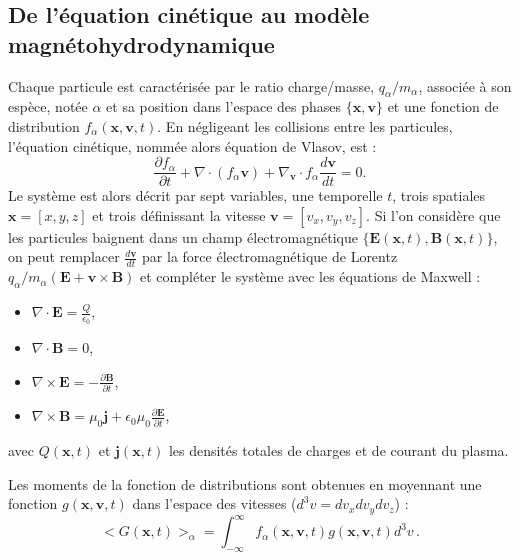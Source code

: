 \subsection{De l'équation cinétique au modèle magnétohydrodynamique}
\label{ssec-1111}

Chaque particule est caractérisée par le ratio charge/masse, $q_{\alpha}/m_{\alpha}$, associée à son espèce, notée $\alpha$ et sa position dans l'espace des phases $\{\mathbf{x},\mathbf{v}\}$ et une fonction de distribution $f_{\alpha}(\mathbf{x},\mathbf{v},t)$. En négligeant les collisions entre les particules, l'équation cinétique, nommée alors équation de Vlasov, est : 
\begin{equation}
\frac{\partial f_{\alpha}}{\partial t} + \nabla \cdot (f_{\alpha} \mathbf{v}) + \nabla_{\mathbf{v}}  \cdot  f_{\alpha}  \frac{d \mathbf{v}}{d t}= 0.
\label{kinetic vlasov}
\end{equation}
Le système est alors décrit par sept variables, une temporelle $t$, trois spatiales $\mathbf{x}=[x,y,z]$ et trois définissant la vitesse $\mathbf{v}=[v_x,v_y,v_z]$. Si l'on considère que les particules baignent dans un champ électromagnétique $\{\mathbf{E}(\mathbf{x},t),\mathbf{B}(\mathbf{x},t)\}$, on peut remplacer $\frac{d \mathbf{v}}{d t}$ par la force électromagnétique de Lorentz $q_{\alpha}/m_{\alpha} (\mathbf{E} + \mathbf{v} \times \mathbf{B})$ et compléter le système avec les équations de Maxwell :
\begin{itemize}
 \item $\nabla \cdot \mathbf{E} = \frac{Q}{\epsilon_0}$,
 \item $\nabla \cdot \mathbf{B} = 0$,
 \item $\nabla \times \mathbf{E} = -\frac{\partial \mathbf{B}}{\partial t}$,
 \item $\nabla \times \mathbf{B} = \mu_0 \mathbf{j} + \epsilon_0 \mu_0\frac{\partial \mathbf{E}}{\partial t}$,
\end{itemize}
avec $Q(\mathbf{x},t)$ et  $\mathbf{j}(\mathbf{x},t)$ les densités totales de charges et de courant du plasma. 

Les moments de la fonction de distributions sont obtenues en moyennant une fonction $g(\mathbf{x},\mathbf{v},t)$ dans l'espace des vitesses ($d^3v=dv_xdv_ydv_z$) : 
\begin{equation}
 <G(\mathbf{x},t)>_{\alpha} = \int^{\infty}_{-\infty} f_{\alpha}(\mathbf{x},\mathbf{v},t) g(\mathbf{x},\mathbf{v},t) d^3v \, .
\end{equation}

